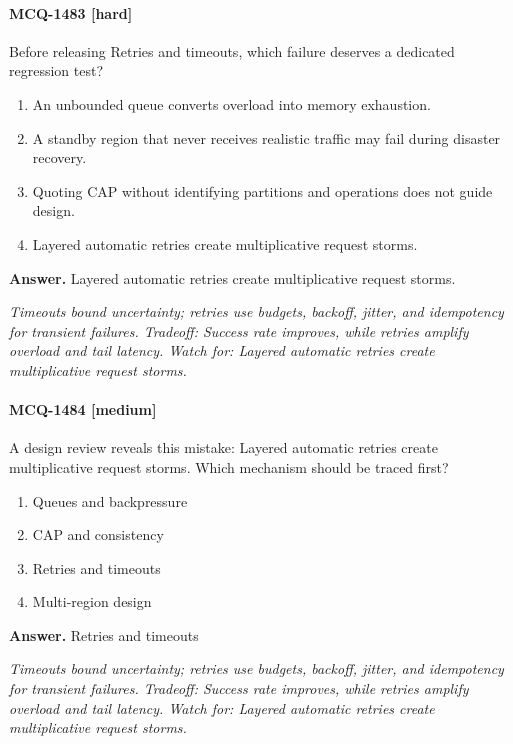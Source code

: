 \paragraph{MCQ-1483 [hard]} Before releasing Retries and timeouts, which failure deserves a dedicated regression test?
\begin{enumerate}[label=\Alph*.]
\item An unbounded queue converts overload into memory exhaustion.
\item A standby region that never receives realistic traffic may fail during disaster recovery.
\item Quoting CAP without identifying partitions and operations does not guide design.
\item Layered automatic retries create multiplicative request storms.
\end{enumerate}
\noindent\textbf{Answer.} Layered automatic retries create multiplicative request storms.
\par\textit{Timeouts bound uncertainty; retries use budgets, backoff, jitter, and idempotency for transient failures. Tradeoff: Success rate improves, while retries amplify overload and tail latency. Watch for: Layered automatic retries create multiplicative request storms.}
\paragraph{MCQ-1484 [medium]} A design review reveals this mistake: Layered automatic retries create multiplicative request storms. Which mechanism should be traced first?
\begin{enumerate}[label=\Alph*.]
\item Queues and backpressure
\item CAP and consistency
\item Retries and timeouts
\item Multi-region design
\end{enumerate}
\noindent\textbf{Answer.} Retries and timeouts
\par\textit{Timeouts bound uncertainty; retries use budgets, backoff, jitter, and idempotency for transient failures. Tradeoff: Success rate improves, while retries amplify overload and tail latency. Watch for: Layered automatic retries create multiplicative request storms.}
